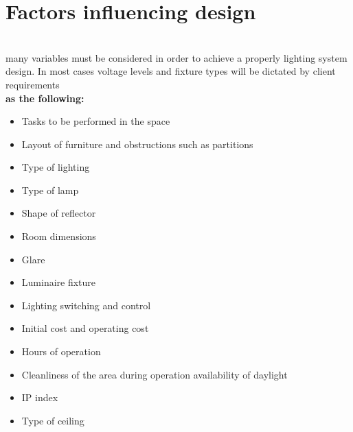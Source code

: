 \documentclass[12pt,fleqn]{book} %
\begin{document}
  \section{Factors influencing design }
  \\ many variables must be considered in order to achieve a properly lighting system design. In most cases voltage levels and fixture types will be dictated by client requirements 
 \\ \textbf {as the following:}
\begin {itemize}
\item {Tasks to be performed in the space}
\item {Layout of furniture and obstructions such as partitions}
\item {Type of lighting}
\item {Type of lamp}
\item {Shape of reflector}
\item {Room dimensions}
\item {Glare}
\item {Luminaire fixture}
\item {Lighting switching and control}
\item {Initial cost and operating cost}
\item {Hours of operation}
\item {Cleanliness of the area during operation availability of daylight}
\item {IP index}
\item {Type of ceiling}

\end {itemize}
\end{document}
